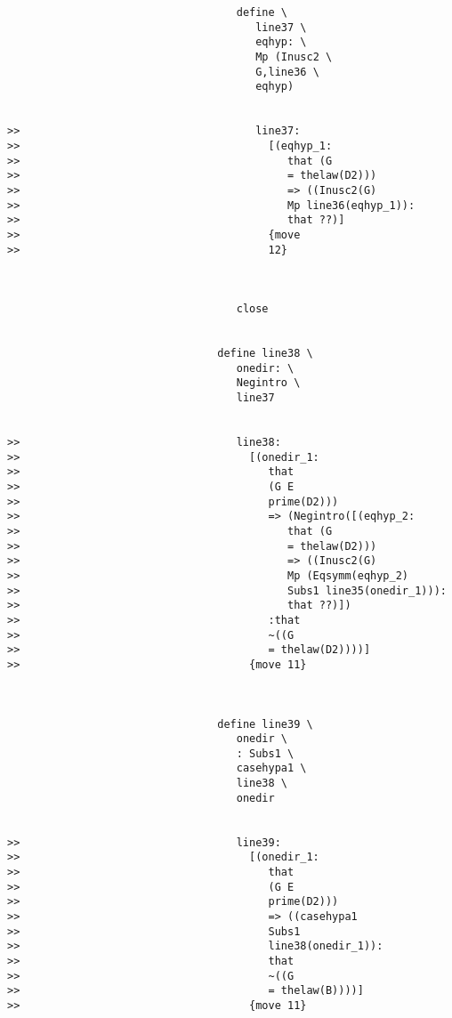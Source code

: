 \documentclass[12pt]{article}
\begin{document}
\begin{verbatim}
                                    define \
                                       line37 \
                                       eqhyp: \
                                       Mp (Inusc2 \
                                       G,line36 \
                                       eqhyp)


>>                                     line37:
>>                                       [(eqhyp_1:
>>                                          that (G
>>                                          = thelaw(D2)))
>>                                          => ((Inusc2(G)
>>                                          Mp line36(eqhyp_1)):
>>                                          that ??)]
>>                                       {move
>>                                       12}



                                    close


                                 define line38 \
                                    onedir: \
                                    Negintro \
                                    line37


>>                                  line38:
>>                                    [(onedir_1:
>>                                       that
>>                                       (G E
>>                                       prime(D2)))
>>                                       => (Negintro([(eqhyp_2:
>>                                          that (G
>>                                          = thelaw(D2)))
>>                                          => ((Inusc2(G)
>>                                          Mp (Eqsymm(eqhyp_2)
>>                                          Subs1 line35(onedir_1))):
>>                                          that ??)])
>>                                       :that
>>                                       ~((G
>>                                       = thelaw(D2))))]
>>                                    {move 11}



                                 define line39 \
                                    onedir \
                                    : Subs1 \
                                    casehypa1 \
                                    line38 \
                                    onedir


>>                                  line39:
>>                                    [(onedir_1:
>>                                       that
>>                                       (G E
>>                                       prime(D2)))
>>                                       => ((casehypa1
>>                                       Subs1
>>                                       line38(onedir_1)):
>>                                       that
>>                                       ~((G
>>                                       = thelaw(B))))]
>>                                    {move 11}




\end{verbatim}
\end{document}
